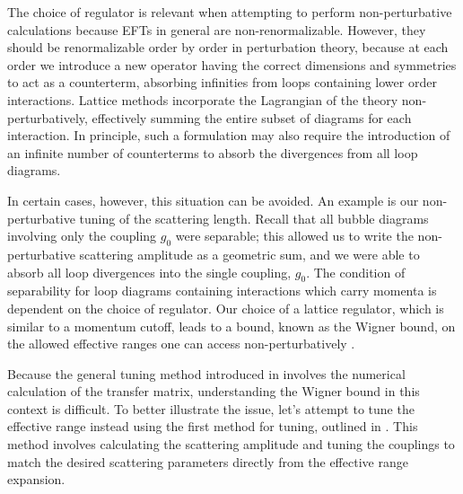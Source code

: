 The choice of regulator is relevant when attempting to perform non-perturbative calculations because EFTs in general are non-renormalizable. However, they should be renormalizable order by order in perturbation theory, because at each order we introduce a new operator having the correct dimensions and symmetries to act as a counterterm, absorbing infinities from loops containing lower order interactions. Lattice methods incorporate the Lagrangian of the theory non-perturbatively, effectively summing the entire subset of diagrams for each interaction. In principle, such a formulation may also require the introduction of an infinite number of counterterms to absorb the divergences from all loop diagrams. 

In certain cases, however, this situation can be avoided. An example is our non-perturbative tuning of the scattering length. Recall that all bubble diagrams involving only the coupling $g_0$ were separable; this allowed us to write the non-perturbative scattering amplitude as a geometric sum, and we were able to absorb all loop divergences into the single coupling, $g_0$. The condition of separability for loop diagrams containing interactions which carry momenta is dependent on the choice of regulator. Our choice of a lattice regulator, which is similar to a momentum cutoff, leads to a bound, known as the Wigner bound, on the allowed effective ranges one can access non-perturbatively \cite{PhysRev.98.145,Phillips:1996ae,Cohen:1996my}.

Because the general tuning method introduced in  involves the numerical calculation of the transfer matrix, understanding the Wigner bound in this context is difficult. To better illustrate the issue, let's attempt to tune the effective range instead using the first method for tuning, outlined in . This method involves calculating the scattering amplitude and tuning the couplings to match the desired scattering parameters directly from the effective range expansion. 


